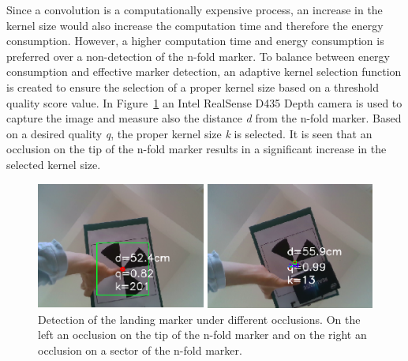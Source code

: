 \documentclass[conference, onecolumn, draftclsnofoot]{IEEEtran}
\begin{document}


Since a convolution is a computationally expensive process, an increase
in the kernel size would also increase the computation time and
therefore the energy consumption. However, a higher computation time and energy consumption
is preferred over a non-detection of the n-fold marker. To balance
between energy consumption and effective marker detection, an adaptive
kernel selection function is created to ensure the selection of a
proper kernel size based on a threshold quality score value. In Figure~\ref{fig:NfoldOcclusions} an Intel RealSense D435 Depth camera is used
to capture the image and measure also the distance \emph{d} from the n-fold
marker. Based on a desired quality \emph{q}, the proper kernel size \emph{k} is
selected. It is seen that an occlusion on the tip of the n-fold marker
results in a significant increase in the selected kernel size.




%

\begin{figure}[t]
\centering
\includegraphics[scale=0.25]{nfold_occlusions.png}
\caption{Detection of the landing marker under different
  occlusions. On the left an occlusion on the tip of the n-fold marker
  and on the right an occlusion on a sector of the n-fold marker.}
\label{fig:NfoldOcclusions}
\end{figure}
\end{document}

